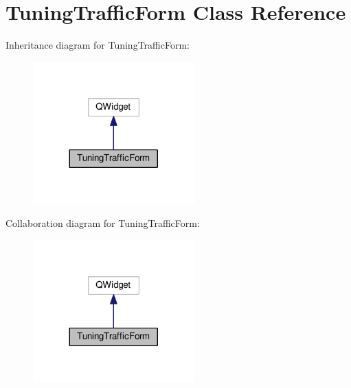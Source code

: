 \hypertarget{class_tuning_traffic_form}{}\section{Tuning\+Traffic\+Form Class Reference}
\label{class_tuning_traffic_form}


Inheritance diagram for Tuning\+Traffic\+Form\+:
\nopagebreak
\begin{figure}[H]
\begin{center}
\leavevmode
\includegraphics[width=176pt]{class_tuning_traffic_form__inherit__graph}
\end{center}
\end{figure}


Collaboration diagram for Tuning\+Traffic\+Form\+:
\nopagebreak
\begin{figure}[H]
\begin{center}
\leavevmode
\includegraphics[width=176pt]{class_tuning_traffic_form__coll__graph}
\end{center}
\end{figure}
